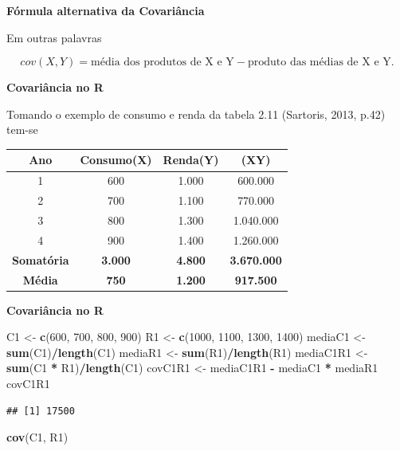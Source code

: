 \documentclass[
]{book}
\newenvironment{Shaded}{\begin{snugshade}}{\end{snugshade}}
\newcommand{\DecValTok}[1]{\textcolor[rgb]{0.00,0.00,0.81}{#1}}
\newcommand{\KeywordTok}[1]{\textcolor[rgb]{0.13,0.29,0.53}{\textbf{#1}}}
\newcommand{\NormalTok}[1]{#1}
\newcommand{\OperatorTok}[1]{\textcolor[rgb]{0.81,0.36,0.00}{\textbf{#1}}}
\newcommand{\StringTok}[1]{\textcolor[rgb]{0.31,0.60,0.02}{#1}}
\begin{document}
\textbf{Fórmula alternativa da Covariância}

Em outras palavras

\begin{equation*}
  cov(X,Y) = \text{média dos produtos de X e Y} - \text{produto das médias de X e Y}.
\end{equation*}

\textbf{Covariância no R}

Tomando o exemplo de consumo e renda da tabela 2.11 (Sartoris, 2013, p.42) tem-se

\begin{longtable}[]{@{}cccc@{}}
\toprule
Ano & Consumo(X) & Renda(Y) & (XY)\tabularnewline
\midrule
\endhead
1 & 600 & 1.000 & 600.000\tabularnewline
2 & 700 & 1.100 & 770.000\tabularnewline
3 & 800 & 1.300 & 1.040.000\tabularnewline
4 & 900 & 1.400 & 1.260.000\tabularnewline
\textbf{Somatória} & \textbf{3.000} & \textbf{4.800} & \textbf{3.670.000}\tabularnewline
\textbf{Média} & \textbf{750} & \textbf{1.200} & \textbf{917.500}\tabularnewline
\bottomrule
\end{longtable}

\textbf{Covariância no R}

\begin{Shaded}
\begin{Highlighting}[]
\NormalTok{C1 <-}\StringTok{ }\KeywordTok{c}\NormalTok{(}\DecValTok{600}\NormalTok{, }\DecValTok{700}\NormalTok{, }\DecValTok{800}\NormalTok{, }\DecValTok{900}\NormalTok{)}
\NormalTok{R1 <-}\StringTok{ }\KeywordTok{c}\NormalTok{(}\DecValTok{1000}\NormalTok{, }\DecValTok{1100}\NormalTok{, }\DecValTok{1300}\NormalTok{, }\DecValTok{1400}\NormalTok{)}
\NormalTok{mediaC1 <-}\StringTok{ }\KeywordTok{sum}\NormalTok{(C1)}\OperatorTok{/}\KeywordTok{length}\NormalTok{(C1)}
\NormalTok{mediaR1 <-}\StringTok{ }\KeywordTok{sum}\NormalTok{(R1)}\OperatorTok{/}\KeywordTok{length}\NormalTok{(R1)}
\NormalTok{mediaC1R1 <-}\StringTok{ }\KeywordTok{sum}\NormalTok{(C1 }\OperatorTok{*}\StringTok{ }\NormalTok{R1)}\OperatorTok{/}\KeywordTok{length}\NormalTok{(C1)}
\NormalTok{covC1R1 <-}\StringTok{ }\NormalTok{mediaC1R1 }\OperatorTok{-}\StringTok{ }\NormalTok{mediaC1 }\OperatorTok{*}\StringTok{ }\NormalTok{mediaR1}
\NormalTok{covC1R1}
\end{Highlighting}
\end{Shaded}

\begin{verbatim}
## [1] 17500
\end{verbatim}

\begin{Shaded}
\begin{Highlighting}[]
\KeywordTok{cov}\NormalTok{(C1, R1)}
\end{Highlighting}
\end{Shaded}
\end{document}
